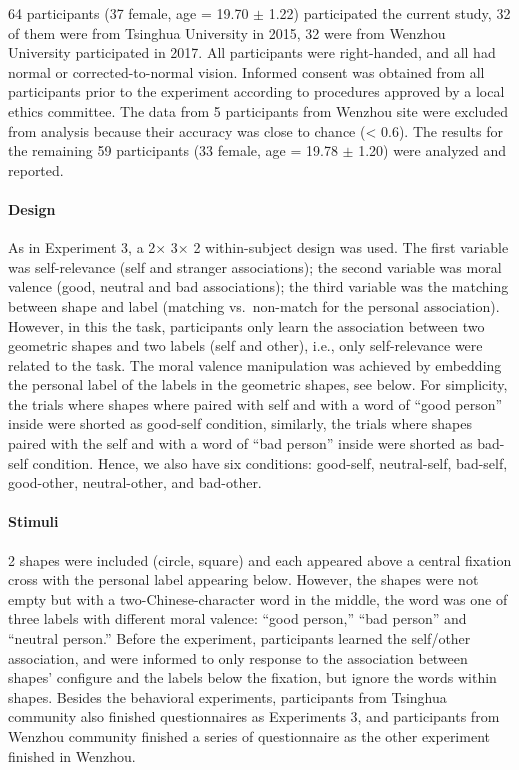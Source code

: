 \documentclass[
  english,
  man]{apa6}
\let\oldparagraph\paragraph
\renewcommand{\paragraph}[1]{\oldparagraph{#1}\mbox{}}
\begin{document}
64 participants (37 female, age = 19.70 \(\pm\) 1.22) participated the current study, 32 of them were from Tsinghua University in 2015, 32 were from Wenzhou University participated in 2017. All participants were right-handed, and all had normal or corrected-to-normal vision. Informed consent was obtained from all participants prior to the experiment according to procedures approved by a local ethics committee. The data from 5 participants from Wenzhou site were excluded from analysis because their accuracy was close to chance (\textless{} 0.6). The results for the remaining 59 participants (33 female, age = 19.78 \(\pm\) 1.20) were analyzed and reported.

\hypertarget{design-3}{%
\paragraph{Design}\label{design-3}}

As in Experiment 3, a 2× 3× 2 within-subject design was used. The first variable was self-relevance (self and stranger associations); the second variable was moral valence (good, neutral and bad associations); the third variable was the matching between shape and label (matching vs.~non-match for the personal association).
However, in this the task, participants only learn the association between two geometric shapes and two labels (self and other), i.e., only self-relevance were related to the task. The moral valence manipulation was achieved by embedding the personal label of the labels in the geometric shapes, see below. For simplicity, the trials where shapes where paired with self and with a word of ``good person'' inside were shorted as good-self condition, similarly, the trials where shapes paired with the self and with a word of ``bad person'' inside were shorted as bad-self condition. Hence, we also have six conditions: good-self, neutral-self, bad-self, good-other, neutral-other, and bad-other.

\hypertarget{stimuli-4}{%
\paragraph{Stimuli}\label{stimuli-4}}

2 shapes were included (circle, square) and each appeared above a central fixation cross with the personal label appearing below. However, the shapes were not empty but with a two-Chinese-character word in the middle, the word was one of three labels with different moral valence: ``good person,'' ``bad person'' and ``neutral person.'' Before the experiment, participants learned the self/other association, and were informed to only response to the association between shapes' configure and the labels below the fixation, but ignore the words within shapes. Besides the behavioral experiments, participants from Tsinghua community also finished questionnaires as Experiments 3, and participants from Wenzhou community finished a series of questionnaire as the other experiment finished in Wenzhou.
\end{document}

